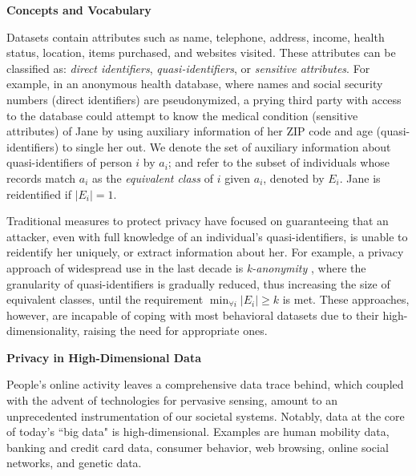 \documentclass[12pt]{article}
\newcommand{\comment}[1]{\noindent\textsf{\textbf{\textcolor{Blue}{[COMMENT: #1]}}}}
\begin{document}
\vspace{.15cm}
\noindent\textbf{\normalsize{Concepts and Vocabulary}}
\vspace{.2cm}


\noindent Datasets contain attributes such as name, telephone, address, income, health status, location, items purchased, and websites visited. These attributes can be classified as: \textit{direct identifiers}, \textit{quasi-identifiers}, or \textit{sensitive attributes}. For example, in an anonymous health database, where names and social security numbers (direct identifiers) are pseudonymized, a prying third party with access to the database could attempt to know the medical condition (sensitive attributes) of Jane by using auxiliary information of her ZIP code and age (quasi-identifiers) to single her out. We denote the set of auxiliary information about quasi-identifiers of person $i$ by $a_i$; and refer to the subset of individuals whose records match $a_i$ as the \textit{equivalent class} of $i$ given $a_i$, denoted by $E_i$. Jane is reidentified if $|E_i|=1$. \iffalse(see example in Appendix I).\fi

Traditional measures to protect privacy have focused on guaranteeing that an attacker, even with full knowledge of an individual's quasi-identifiers, is unable to reidentify her uniquely\cite{priv-kanonymity02}, or extract information about her\cite{machanavajjhala2006ell,li2007t}. For example, a privacy approach of widespread use in the last decade is \textit{k-anonymity} \cite{priv-kanonymity02}, where the granularity of quasi-identifiers is gradually reduced, thus increasing the size of equivalent classes, until the requirement $\min_{\forall i} |E_i| \geq k$ is met\iffalse(see example in Appendix I)\fi. These approaches, however, are incapable of coping with most behavioral datasets due to their high-dimensionality\cite{noriega2015balancing}, raising the need for appropriate ones.

\vspace{.3cm}
\noindent\textbf{\normalsize{Privacy in High-Dimensional Data}}
\vspace{.2cm}

\noindent People's online activity leaves a comprehensive data trace behind, which coupled with the advent of technologies for pervasive sensing, amount to an unprecedented instrumentation of our societal systems. Notably, data at the core of today's  ``big data" is high-dimensional. Examples are human mobility data, banking and credit card data, consumer behavior, web browsing, online social networks, and genetic data.
\end{document}
